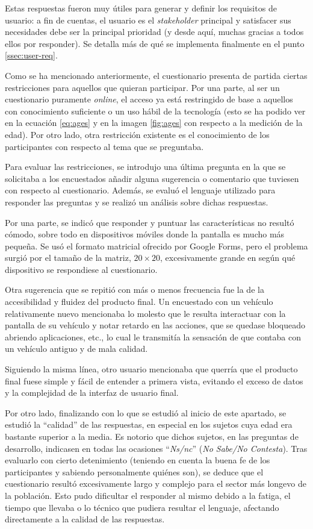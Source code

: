 Estas respuestas fueron muy útiles para generar y definir los requisitos de usuario:
a fin de cuentas, el usuario es el \textit{stakeholder} principal y satisfacer sus
necesidades debe ser la principal prioridad (y desde aquí, muchas gracias a todos
ellos por responder). Se detalla más de qué se implementa finalmente en el punto
\ref{ssec:user-req}.

Como se ha mencionado anteriormente, el cuestionario presenta de partida ciertas
restricciones para aquellos que quieran participar. Por una parte, al ser un cuestionario
puramente \textit{online}, el acceso ya está restringido de base a aquellos con
conocimiento suficiente o un uso hábil de la tecnología (esto se ha podido ver
en la ecuación \ref{eq:ages} y en la imagen \ref{fig:ages} con respecto a la medición
de la edad). Por otro lado, otra restricción existente es el conocimiento de los
participantes con respecto al tema que se preguntaba.

Para evaluar las restricciones, se introdujo una última pregunta en la que se
solicitaba a los encuestados añadir alguna sugerencia o comentario que tuviesen con
respecto al cuestionario. Además, se evaluó el lenguaje utilizado para responder las
preguntas y se realizó un análisis sobre dichas respuestas.

Por una parte, se indicó que responder y puntuar las características no resultó
cómodo, sobre todo en dispositivos móviles donde la pantalla es mucho más pequeña.
Se usó el formato matricial ofrecido por Google Forms, pero el problema surgió
por el tamaño de la matriz, $20 \times 20$, excesivamente grande en según qué
dispositivo se respondiese al cuestionario.

Otra sugerencia que se repitió con más o menos frecuencia fue la de la accesibilidad
y fluidez del producto final. Un encuestado con un vehículo relativamente nuevo
mencionaba lo molesto que le resulta interactuar con la pantalla de su vehículo y notar
retardo en las acciones, que se quedase bloqueado abriendo aplicaciones, etc., lo cual
le transmitía la sensación de que contaba con un vehículo antiguo y de mala calidad.

Siguiendo la misma línea, otro usuario mencionaba que querría que el producto final
fuese simple y fácil de entender a primera vista, evitando el exceso de datos y la
complejidad de la interfaz de usuario final.

Por otro lado, finalizando con lo que se estudió al inicio de este apartado, se
estudió la ``calidad'' de las respuestas, en especial en los sujetos cuya edad
era bastante superior a la media. Es notorio que dichos sujetos, en las preguntas
de desarrollo, indicasen en todas las ocasiones ``\textit{Ns/nc}'' (\textit{No Sabe/No Contesta}).
Tras evaluarlo con cierto detenimiento (teniendo en cuenta la buena fe de los
participantes y sabiendo personalmente quiénes son), se deduce que el cuestionario resultó
excesivamente largo y complejo para el sector
más longevo de la población. Esto pudo dificultar el responder al mismo debido
a la fatiga, el tiempo que llevaba o lo técnico que pudiera resultar el lenguaje,
afectando directamente a la calidad de las respuestas.

